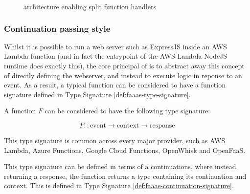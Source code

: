 \begin{figure}[htp]
    \centering
    \quad
    \caption{\faas{} architecture enabling split function handlers}
\end{figure}

\subsubsection{Continuation passing style}
Whilst it is possible to run a web server such as ExpressJS inside an AWS Lambda function (and in fact the entrypoint of the AWS Lambda NodeJS runtime does exactly this), the core principal of \faas{} is to abstract away this concept of directly defining the webserver, and instead to execute logic in reponse to an event. As a result, a typical \faas{} function can be considered to have a function signature defined in Type Signature \ref{def:faaas-type-signature}.

\begin{signature}
\label{def:faaas-type-signature}
A \faas{} function $F$ can be considered to have the following type signature:

$$F :: \textrm{event} \rightarrow \textrm{context} \rightarrow \textrm{response}$$
\end{signature}

This type signature is common across every major \faas{} provider, such as AWS Lambda\cite{amazonAWSLambda2024}, Azure Functions\cite{azureAzureFunctions2024}, Google Cloud Functions\cite{googleGoogleCloudFunctions2024}, OpenWhisk\cite{apacheOpenWhisk2024} and OpenFaaS\cite{ellisOpenFaaS2024}.

This type signature can be defined in terms of a continuations, where instead returning a response, the function returns a type containing its continuation and context. This is defined in Type Signature \ref{def:faaas-continuation-signature}.

